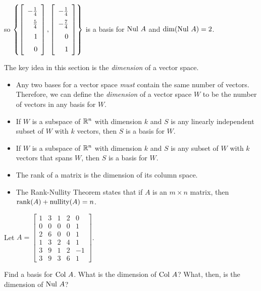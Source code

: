 \begin{example}
so $\left\{\left[ \renewcommand{\arraystretch}{1.5}  \begin{array}{r}-\frac{1}{4}\\\frac{5}{4}\\1\\0\end{array} \right], \left[ \renewcommand{\arraystretch}{1.5}  \begin{array}{r}-\frac{1}{4}\\-\frac{7}{4}\\0\\1 \end{array} \right] \right\}$ is a basis for $\text{Nul } A$ and $\dim(\text{Nul } A) = 2$. 

\end{example}

\label{sec:base_dim_summ}

The key idea in this section is the \emph{dimension} of a vector space.

\begin{itemize}
\item Any two bases for a vector space \emph{must} contain the same number of vectors. Therefore, we can define the \emph{dimension} of a vector space $W$ to be the number of vectors in any basis for $W$.
\item If $W$ is a subspace of $\mathbb{R}^n$ with dimension $k$ and $S$ is any linearly independent subset of $W$ with $k$ vectors, then $S$ is a basis for $W$.
\item If $W$ is a subspace of $\mathbb{R}^n$ with dimension $k$ and $S$ is any subset of $W$ with $k$ vectors that spans $W$, then $S$ is a basis for $W$.
\item The rank of a matrix is the dimension of its column space. 
\item The Rank-Nullity Theorem states that if $A$ is an $m \times n$ matrix, then $\text{rank}(A) + \text{nullity}(A) = n$.
\end{itemize}



\label{sec:base_dim_exer}

\be
\item Let $A =  \left[ \begin{array}{ccccr} 1&3&1&2&0\\ 0&0&0&0&1 \\ 2&6&0&0&1\\ 1&3&2&4&1 \\ 3&9&1&2&-1\\ 3&9&3&6&1 \end{array} \right]$. 
	\ba
	\item Find a basis for $\text{Col } A$. What is the dimension of $\text{Col } A$? What, then, is the dimension of $\text{Nul } A$? 
	

